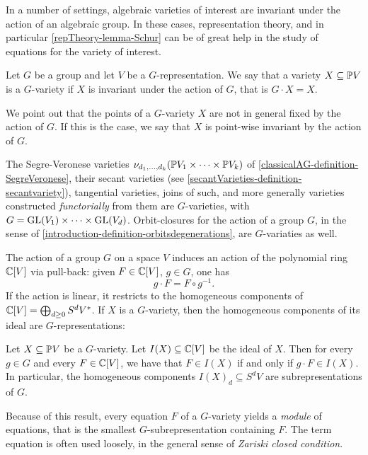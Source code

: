 In a number of settings, algebraic varieties of interest are invariant under the action of an algebraic group. In these cases, representation theory, and in particular \ref{repTheory-lemma-Schur} can be of great help in the study of equations for the variety of interest.

\begin{definition}
 \label{eqnRepTheory-definition-Gvariety}
 Let $G$ be a group and let $V$ be a $G$-representation. We say that a variety $X \subseteq \mathbb{P} V$ is a $G$-variety if $X$ is invariant under the action of $G$, that is $G \cdot X = X$. 
\end{definition}
We point out that the points of a $G$-variety $X$ are not in general fixed by the action of $G$. If this is the case, we say that $X$ is point-wise invariant by the action of $G$.

The Segre-Veronese varieties $\nu_{d_1 , \ldots , d_k} ( \mathbb{P} V_1 \times \cdots \times \mathbb{P} V_k)$ of \ref{classicalAG-definition-SegreVeronese}, their secant varieties (see \ref{secantVarieties-definition-secantvariety}), tangential varieties, joins of such, and more generally varieties constructed \emph{functorially} from them are $G$-varieties, with $G = \mathrm{GL}(V_1) \times \cdots \times \mathrm{GL}(V_d)$. Orbit-closures for the action of a group $G$, in the sense of \ref{introduction-definition-orbitsdegenerations}, are $G$-variaties as well.

The action of a group $G$ on a space $V$ induces an action of the polynomial ring $\mathbb{C}[V]$ via pull-back: given $F \in \mathbb{C}[V]$, $g \in G$, one has 
\[
g \cdot F = F \circ g^{-1}.
\]
If the action is linear, it restricts to the homogeneous components of $\mathbb{C}[V] = \bigoplus_{d \geq 0} S^d V^*$. If $X$ is a $G$-variety, then the homogeneous components of its ideal are $G$-representations:
\begin{lemma}
 Let $X \subseteq \mathbb{P} V$ be a $G$-variety. Let $I(X) \subseteq \mathbb{C}[V]$ be the ideal of $X$. Then for every $g \in G$ and every $F \in \mathbb{C}[V]$, we have that $F \in I(X)$ if and only if $g \cdot F \in I(X)$. In particular, the homogeneous components $I(X)_d \subseteq  S^d V$ are subrepresentations of $G$.
\end{lemma}
Because of this result, every equation $F$ of a $G$-variety yields a \emph{module} of equations, that is the smallest $G$-subrepresentation containing $F$. The term equation is often used loosely, in the general sense of \emph{Zariski closed condition}.

